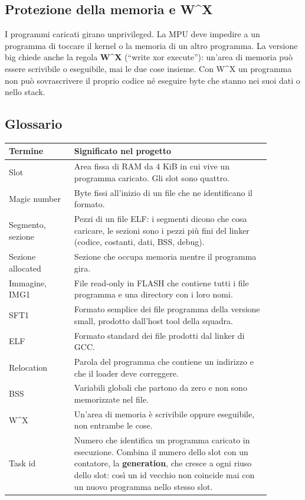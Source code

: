 \subsection{Protezione della memoria e W\textasciicircum{}X}
I programmi caricati girano unprivileged. La MPU deve impedire a un programma di toccare il kernel o la memoria di un altro programma. La versione big chiede anche la regola \textbf{W\textasciicircum{}X} (``write xor execute''): un'area di memoria può essere scrivibile o eseguibile, mai le due cose insieme. Con W\textasciicircum{}X un programma non può sovrascrivere il proprio codice né eseguire byte che stanno nei suoi dati o nello stack.

\subsection{Glossario}
\begin{center}
    \small
    \begin{tabular}{|p{0.22\linewidth}|p{0.66\linewidth}|}
        \hline
        \raggedright Termine & \raggedright Significato nel progetto \tabularnewline
        \hline\hline
        \raggedright Slot & \raggedright Area fissa di RAM da 4 KiB in cui vive un programma caricato. Gli slot sono quattro. \tabularnewline
        \hline
        \raggedright Magic number & \raggedright Byte fissi all'inizio di un file che ne identificano il formato. \tabularnewline
        \hline
        \raggedright Segmento, sezione & \raggedright Pezzi di un file ELF: i segmenti dicono che cosa caricare, le sezioni sono i pezzi più fini del linker (codice, costanti, dati, BSS, debug). \tabularnewline
        \hline
        \raggedright Sezione allocated & \raggedright Sezione che occupa memoria mentre il programma gira. \tabularnewline
        \hline
        \raggedright Immagine, IMG1 & \raggedright File read-only in FLASH che contiene tutti i file programma e una directory con i loro nomi. \tabularnewline
        \hline
        \raggedright SFT1 & \raggedright Formato semplice dei file programma della versione small, prodotto dall'host tool della squadra. \tabularnewline
        \hline
        \raggedright ELF & \raggedright Formato standard dei file prodotti dal linker di GCC. \tabularnewline
        \hline
        \raggedright Relocation & \raggedright Parola del programma che contiene un indirizzo e che il loader deve correggere. \tabularnewline
        \hline
        \raggedright BSS & \raggedright Variabili globali che partono da zero e non sono memorizzate nel file. \tabularnewline
        \hline
        \raggedright W\textasciicircum{}X & \raggedright Un'area di memoria è scrivibile oppure eseguibile, non entrambe le cose. \tabularnewline
        \hline
        \raggedright Task id & \raggedright Numero che identifica un programma caricato in esecuzione. Combina il numero dello slot con un contatore, la \textbf{generation}, che cresce a ogni riuso dello slot: così un id vecchio non coincide mai con un nuovo programma nello stesso slot. \tabularnewline
        \hline
    \end{tabular}
\end{center}


